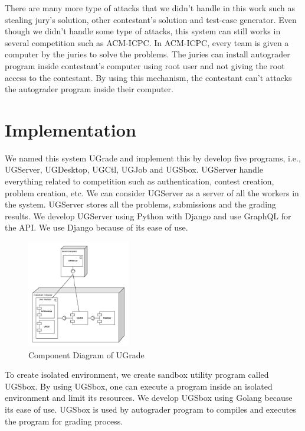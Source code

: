 \documentclass[conference]{IEEEtran}
\begin{document}
There are many more type of attacks that we didn't handle in this work such as stealing jury's solution, other contestant's solution and test-case generator. Even though we didn't handle some type of attacks, this system can still works in several competition such as ACM-ICPC. In ACM-ICPC, every team is given a computer by the juries to solve the problems. The juries can install autograder program inside contestant's computer using root user and not giving the root access to the contestant. By using this mechanism, the contestant can't attacks the autograder program inside their computer.

\section{Implementation}

We named this system UGrade and implement this by develop five programs, i.e., UGServer, UGDesktop, UGCtl, UGJob and UGSbox. UGServer handle everything related to competition such as authentication, contest creation, problem creation, etc. We can consider UGServer as a server of all the workers in the system. UGServer stores all the problems, submissions and the grading results. We develop UGServer using Python with Django and use GraphQL for the API. We use Django because of its ease of use.

\begin{figure}[htbp]
\centerline{\includegraphics[width=0.4\textwidth]{images/paper-component.jpeg}}
\caption{Component Diagram of UGrade}
\label{component}
\end{figure}

To create isolated environment, we create sandbox utility program called UGSbox. By using UGSbox, one can execute a program inside an isolated environment and limit its resources. We develop UGSbox using Golang because its ease of use. UGSbox is used by autograder program to compiles and executes the program for grading process.
\end{document}
